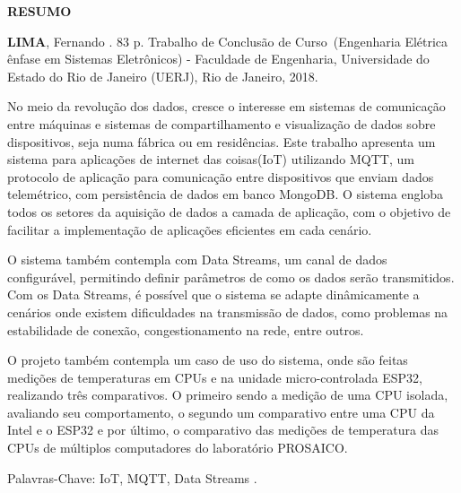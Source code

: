 \begin{center}
\textbf{RESUMO}
\end{center}

%
%


$\!$\\

\hspace{-1.3cm}\textbf{LIMA}, Fernando \textit{\setTitulo}. 83 p. Trabalho de Conclusão de Curso~(Engenharia Elétrica ênfase em Sistemas Eletrônicos) - Faculdade de Engenharia, Universidade do Estado do Rio de Janeiro (UERJ), Rio de Janeiro, 2018.

\vspace{.2cm}

No meio da revolução dos dados, cresce o interesse em sistemas de comunicação entre máquinas e sistemas de compartilhamento e visualização de dados  sobre dispositivos, seja numa fábrica ou em residências. Este trabalho apresenta um sistema para aplicações de internet das coisas(IoT) utilizando MQTT, um protocolo de aplicação para comunicação entre dispositivos que enviam dados telemétrico, com persistência de dados em banco MongoDB. O sistema engloba todos os setores da aquisição de dados a camada de aplicação, com o objetivo de facilitar a implementação de aplicações eficientes em cada cenário.

O sistema também contempla com Data Streams, um canal de dados configurável, permitindo definir parâmetros de como os dados serão transmitidos. Com os Data Streams, é possível que o sistema se adapte dinâmicamente a cenários onde existem dificuldades na transmissão de dados, como problemas na estabilidade de conexão, congestionamento na rede, entre outros.

O projeto também contempla um caso de uso do sistema, onde são feitas medições de temperaturas em CPUs e na unidade micro-controlada ESP32, realizando três comparativos. O primeiro sendo a medição de uma CPU isolada, avaliando seu comportamento, o segundo um comparativo entre uma CPU da Intel e o ESP32 e por último, o comparativo das medições de temperatura das CPUs de múltiplos computadores do laboratório PROSAICO. 



\vspace{1cm}

\hspace{-1.3cm}Palavras-Chave: IoT, MQTT, Data Streams .